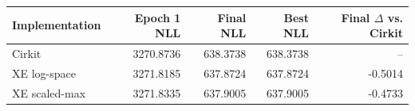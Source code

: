 \begin{tabular}{lrrrr}
\toprule
Implementation & Epoch 1 NLL & Final NLL & Best NLL & Final $\Delta$ vs. Cirkit \\
\midrule
Cirkit & 3270.8736 & 638.3738 & 638.3738 & -- \\
XE log-space & 3271.8185 & 637.8724 & 637.8724 & -0.5014 \\
XE scaled-max & 3271.8335 & 637.9005 & 637.9005 & -0.4733 \\
\bottomrule
\end{tabular}
